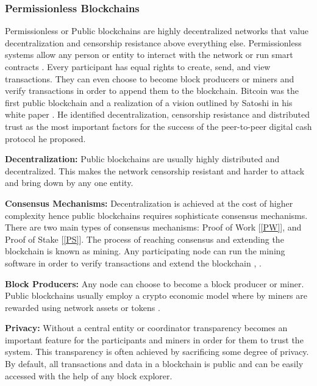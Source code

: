 \subsubsection{Permissionless Blockchains} 
Permissionless or Public blockchains are highly decentralized networks that value decentralization and censorship resistance above everything else. Permissionless systems allow any person or entity to interact with the network or run smart contracts \cite{misc:018}. Every participant has equal rights to create, send, and view transactions. They can even choose to become block producers or miners and verify transactions in order to append them to the blockchain. Bitcoin was the first public blockchain and a realization of a vision outlined by Satoshi in his white paper \cite{paper:001}. He identified decentralization, censorship resistance and distributed trust as the most important factors for the success of the peer-to-peer digital cash protocol he proposed.

\textbf{Decentralization:}
Public blockchains are usually highly distributed and decentralized. This makes the network censorship resistant and harder to attack and bring down by any one entity. 

\textbf{Consensus Mechanisms:}
Decentralization is achieved at the cost of higher complexity hence public blockchains requires sophisticate consensus mechanisms. There are two main types of consensus mechanisms: Proof of Work [\ref{PW}], and Proof of Stake [\ref{PS}]. The process of reaching consensus and extending the blockchain is known as mining. Any participating node can run the mining software in order to verify transactions and extend the blockchain \cite{misc:018}, \cite{misc:017}.

\textbf{Block Producers:}
Any node can choose to become a block producer or miner. Public blockchains usually employ a crypto economic model where by miners are rewarded using network assets or tokens \cite{paper:001}.

\textbf{Privacy:}
Without a central entity or coordinator transparency becomes an important feature for the participants and miners in order for them to trust the system. This transparency is often achieved by sacrificing some degree of privacy. By default, all transactions and data in a blockchain is public and can be easily accessed with the help of any block explorer.  
\vspace{2cm}
